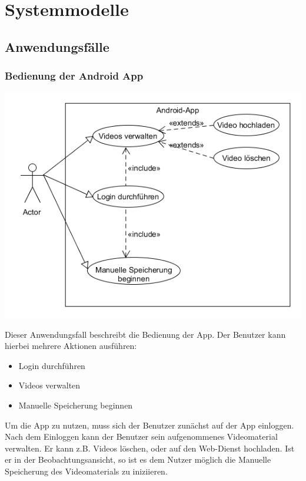 \chapter{Systemmodelle}
\section{Anwendungsfälle}
\subsection{Bedienung der Android App}
\begin{center}
\includegraphics[width=1\textwidth]{subtopicsFuncspec/Res/systemModels/App-AFD-UML.png}
\end{center}
Dieser Anwendungsfall beschreibt die Bedienung der App. 
Der Benutzer kann hierbei mehrere Aktionen ausführen:
\begin{itemize}
\itemsep0pt
\item Login durchführen
\item Videos verwalten
\item Manuelle Speicherung beginnen
\end{itemize}
Um die App zu nutzen, muss sich der Benutzer zunächst auf der App einloggen. Nach dem Einloggen kann der Benutzer sein aufgenommenes Videomaterial verwalten. Er kann z.B. Videos löschen, oder auf den Web-Dienst hochladen.
Ist er in der Beobachtungsansicht, so ist es dem Nutzer möglich die Manuelle Speicherung des Videomaterials zu iniziieren.

